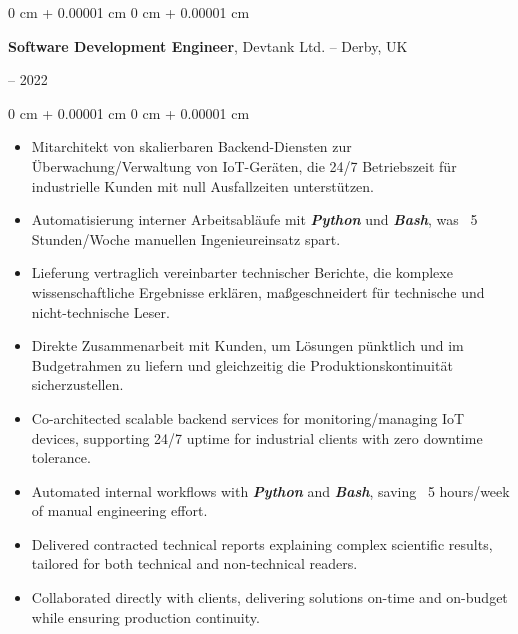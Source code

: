 \documentclass[10pt, letterpaper]{article}
\newenvironment{highlights}{
    \begin{itemize}[
        topsep=0.2 cm,
        parsep=0.2 cm,
        partopsep=0pt,
        itemsep=0.025 cm,
        leftmargin=0 cm + 10pt
    ]
}{
    \end{itemize}
}
\newenvironment{onecolentry}{
    \begin{adjustwidth}{
        0 cm + 0.00001 cm
    }{
        0 cm + 0.00001 cm
    }
}{
    \end{adjustwidth}
}
\newenvironment{twocolentry}[2][]{
    \onecolentry
    \def\secondColumn{#2}
    \setcolumnwidth{\fill, 4.75 cm}
    \begin{paracol}{2}
}{
    \switchcolumn \raggedleft \secondColumn
    \end{paracol}
    \endonecolentry
}
\begin{document}
        \vspace{0.2 cm}

        \begin{twocolentry}{
            2020 – 2022
        }
            \textbf{Software Development Engineer}, Devtank Ltd. -- Derby, UK
        \end{twocolentry}

        \vspace{0.10 cm}
        \begin{onecolentry}
            \begin{highlights}
                \ifdefined\german
                \item Mitarchitekt von skalierbaren Backend-Diensten zur Überwachung/Verwaltung von IoT-Geräten, die 24/7 Betriebszeit für industrielle Kunden mit null Ausfallzeiten unterstützen.
                \item Automatisierung interner Arbeitsabläufe mit \textbf{\textit{Python}} und \textbf{\textit{Bash}}, was ~5 Stunden/Woche manuellen Ingenieureinsatz spart.
                \item Lieferung vertraglich vereinbarter technischer Berichte, die komplexe wissenschaftliche Ergebnisse erklären, maßgeschneidert für technische und nicht-technische Leser.
                \item Direkte Zusammenarbeit mit Kunden, um Lösungen pünktlich und im Budgetrahmen zu liefern und gleichzeitig die Produktionskontinuität sicherzustellen.
                \else
                \item Co-architected scalable backend services for monitoring/managing IoT devices, supporting 24/7 uptime for industrial clients with zero downtime tolerance.
                \item Automated internal workflows with \textbf{\textit{Python}} and \textbf{\textit{Bash}}, saving ~5 hours/week of manual engineering effort.
                \item Delivered contracted technical reports explaining complex scientific results, tailored for both technical and non-technical readers.
                \item Collaborated directly with clients, delivering solutions on-time and on-budget while ensuring production continuity.
                \fi
            \end{highlights}
        \end{onecolentry}

        \vspace{0.15 cm}
\end{document}
